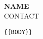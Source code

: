\documentclass[10pt,a4paper]{article}
\begin{document}
\begin{center}
{\LARGE\bfseries {{NAME}}}\\
{{CONTACT}}
\end{center}
\vspace{4pt}
\begin{verbatim}
{{BODY}}
\end{verbatim}
\end{document}
